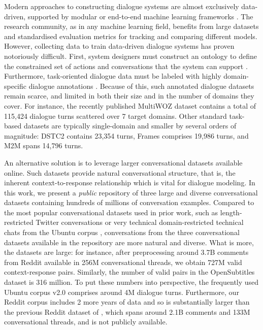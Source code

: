 \documentclass[11pt,a4paper,table]{article}
\begin{document}
Modern approaches to constructing dialogue systems are almost exclusively data-driven, supported by modular or end-to-end machine learning frameworks \cite[\textit{inter alia}]{young:10b,VinyalsL15,Wen:2015emnlp,Wen:2017icml,Wen:17,Mrksic:2018acl,Ramadan:2018acl,Li:2018arxiv}. The research community, as in any machine learning field, benefits from large datasets and standardised evaluation metrics for tracking and comparing different models.
However, collecting data to train data-driven dialogue systems has proven notoriously difficult. First, system designers must construct an ontology to define the constrained set of actions and conversations that the system can support \cite{Henderson:14a,Henderson:14b,Mrksic:15}. Furthermore, task-oriented dialogue data must be labeled with highly domain-specific dialogue annotations \cite{ElAsri:2017sigdial,Budzianowski:2018emnlp}. Because of this, such annotated dialogue datasets remain scarce, and limited in both their size and in the number of domains they cover. For instance, the recently published MultiWOZ dataset \cite{Budzianowski:2018emnlp} contains a total of 115,424 dialogue turns scattered over 7 target domains. Other standard task-based datasets are typically single-domain and smaller by several orders of magnitude: DSTC2 \cite{Henderson2014a} contains 23,354 turns, Frames \cite{ElAsri:2017sigdial} comprises 19,986 turns, and M2M \cite{Shah:2018naacl} spans 14,796 turns.

An alternative solution is to leverage larger conversational datasets available online. Such datasets provide natural conversational structure, that is, the inherent context-to-response relationship which is vital for dialogue modeling. In this work, we present a \textit{public} repository of three large and diverse conversational datasets containing hundreds of millions of conversation examples. Compared to the most popular conversational datasets used in prior work, such as length-restricted Twitter conversations \cite{Ritter:2010naacl} or very technical domain-restricted technical chats from the Ubuntu corpus \cite{Lowe2015TheUD,Lowe:2017dd,gunasekara2019dstc7}, conversations from the three conversational datasets available in the repository are more natural and diverse. What is more, the datasets are large: for instance, after preprocessing around 3.7B comments from Reddit available in 256M conversational threads, we obtain 727M valid context-response pairs. Similarly, the number of valid pairs in the OpenSubtitles dataset is 316 million. To put these numbers into perspective, the frequently used Ubuntu corpus v2.0 comprises around 4M dialogue turns. Furthermore, our Reddit corpus includes 2 more years of data and so is substantially larger than the previous Reddit dataset of , which spans around 2.1B comments and 133M conversational threads, and is not publicly available.
\end{document}
